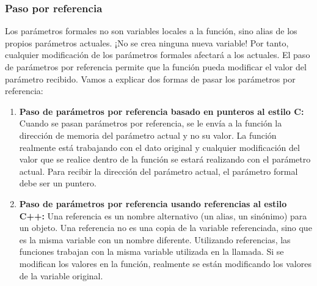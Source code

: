 \subsubsection{Paso por referencia}

Los parámetros formales no son variables locales a la función, sino alias de los propios parámetros actuales. ¡No se crea ninguna nueva variable! Por tanto, cualquier modificación de los parámetros formales afectará a los actuales.  El paso de parámetros por referencia permite que la función pueda modificar el valor del parámetro recibido. Vamos a explicar dos formas de pasar los parámetros por referencia:

\begin{enumerate}
	\item \textbf{Paso de parámetros por referencia basado en punteros al estilo C:}  Cuando se pasan parámetros por referencia, se le envía a la función la dirección de memoria del parámetro actual y no su valor. La función realmente está trabajando con el dato original y cualquier modificación del valor que se realice dentro de la función se estará realizando con el parámetro actual. Para recibir la dirección del parámetro actual, el parámetro formal debe ser un puntero.
	\item \textbf{Paso de parámetros por referencia usando referencias al estilo C++:}  Una referencia es un nombre alternativo (un alias, un sinónimo) para un objeto. Una referencia no es una copia de la variable referenciada, sino que es la misma variable con un nombre diferente. Utilizando referencias, las funciones trabajan con la misma variable utilizada en la llamada. Si se modifican los valores en la función, realmente se están modificando los valores de la variable original.
\end{enumerate}